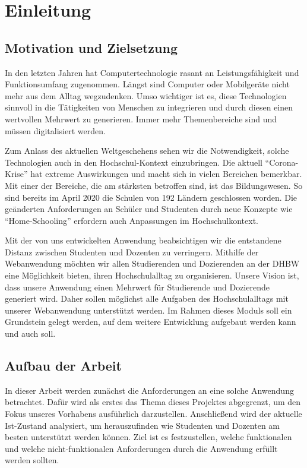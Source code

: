 \chapter{Einleitung}
\section{Motivation und Zielsetzung}
In den letzten Jahren hat Computertechnologie rasant an Leistungsfähigkeit und Funktionsumfang zugenommen.
Längst sind Computer oder Mobilgeräte nicht mehr aus dem Alltag wegzudenken.
Umso wichtiger ist es, diese Technologien sinnvoll in die Tätigkeiten von Menschen zu integrieren und durch diesen einen wertvollen Mehrwert zu generieren.
Immer mehr Themenbereiche sind und müssen digitalisiert werden.

Zum Anlass des aktuellen Weltgeschehens sehen wir die Notwendigkeit, solche Technologien auch in den Hochschul-Kontext einzubringen.
Die aktuell \enquote{Corona-Krise} hat extreme Auswirkungen und macht sich in vielen Bereichen bemerkbar.
Mit einer der Bereiche, die am stärksten betroffen sind, ist das Bildungswesen.
So sind bereits im April 2020 die Schulen von 192 Ländern geschlossen worden.\autocite[S. 845]{Donohue2020}
Die geänderten Anforderungen an Schüler und Studenten durch neue Konzepte wie \enquote{Home-Schooling} erfordern auch Anpassungen im Hochschulkontext.

Mit der von uns entwickelten Anwendung beabsichtigen wir die entstandene Distanz zwischen Studenten und Dozenten zu verringern. 
Mithilfe der Webanwendung möchten wir allen Studierenden und Dozierenden an der DHBW eine Möglichkeit bieten, ihren Hochschulalltag zu organisieren. 
Unsere Vision ist, dass unsere Anwendung einen Mehrwert für Studierende und Dozierende generiert wird.
Daher sollen möglichst alle Aufgaben des Hochschulalltags mit unserer Webanwendung unterstützt werden. 
Im Rahmen dieses Moduls soll ein Grundstein gelegt werden, auf dem weitere Entwicklung aufgebaut werden kann und auch soll.

\clearpage
\section{Aufbau der Arbeit} %
In dieser Arbeit werden zunächst die Anforderungen an eine solche Anwendung betrachtet.
Dafür wird als erstes das Thema dieses Projektes abgegrenzt, um den Fokus unseres Vorhabens ausführlich darzustellen.
Anschließend wird der aktuelle Ist-Zustand analysiert, um herauszufinden wie Studenten und Dozenten am besten unterstützt werden können.
Ziel ist es festzustellen, welche funktionalen und welche nicht-funktionalen Anforderungen durch die Anwendung erfüllt werden sollten.

